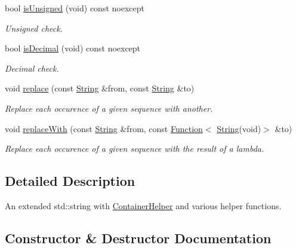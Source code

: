 \begin{DoxyCompactItemize}
bool \mbox{\hyperlink{classo_a_1_1_string_aeb851821fb8dd5ca72d50413f72bb1a4}{is\+Unsigned}} (void) const noexcept
\begin{DoxyCompactList}\small\item\em Unsigned check. \end{DoxyCompactList}\item 
bool \mbox{\hyperlink{classo_a_1_1_string_a30effa3311ecb3f5f29e8d670709f436}{is\+Decimal}} (void) const noexcept
\begin{DoxyCompactList}\small\item\em Decimal check. \end{DoxyCompactList}\item 
void \mbox{\hyperlink{classo_a_1_1_string_a54760c3b5fee78fbcc28a6d81dbfe6b3}{replace}} (const \mbox{\hyperlink{classo_a_1_1_string}{String}} \&from, const \mbox{\hyperlink{classo_a_1_1_string}{String}} \&to)
\begin{DoxyCompactList}\small\item\em Replace each occurence of a given sequence with another. \end{DoxyCompactList}\item 
void \mbox{\hyperlink{classo_a_1_1_string_a9f974d8b83a0ae4232a33d249291f3c4}{replace\+With}} (const \mbox{\hyperlink{classo_a_1_1_string}{String}} \&from, const \mbox{\hyperlink{namespaceo_a_a85bea86b9d05d2b86c77d8ee5b7bbde5}{Function}}$<$ \mbox{\hyperlink{classo_a_1_1_string}{String}}(void)$>$ \&to)
\begin{DoxyCompactList}\small\item\em Replace each occurence of a given sequence with the result of a lambda. \end{DoxyCompactList}\end{DoxyCompactItemize}


\subsection{Detailed Description}
An extended std\+::string with \mbox{\hyperlink{classo_a_1_1_container_helper}{Container\+Helper}} and various helper functions. 

\subsection{Constructor \& Destructor Documentation}
\mbox{\label{classo_a_1_1_string_a10ce41917f151b304f0b465c1ff1ec6e}} 
